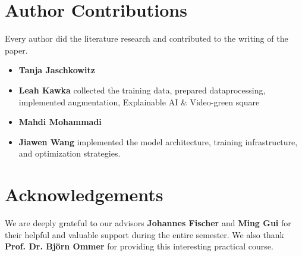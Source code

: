 \clearpage
\setcounter{page}{1}
\maketitlesupplementary

\renewcommand{\thesection}{\arabic{section}}

\section{Author Contributions}
\label{sec:author}
Every author did the literature research and contributed to the writing of the paper. 
% 
\begin{itemize}
    \item \textbf{Tanja Jaschkowitz} 
    \item \textbf{Leah Kawka} collected the training data, prepared dataprocessing, implemented augmentation, Explainable AI \& Video-green square
    \item \textbf{Mahdi Mohammadi}
    \item \textbf{Jiawen Wang} implemented the model architecture, training infrastructure, and optimization strategies.
\end{itemize}
% 

\section*{Acknowledgements}

We are deeply grateful to our advisors \textbf{Johannes Fischer} and \textbf{Ming Gui} for their helpful and valuable support during the entire semester. 
We also thank \textbf{Prof. Dr. Björn Ommer} for providing this interesting practical course.